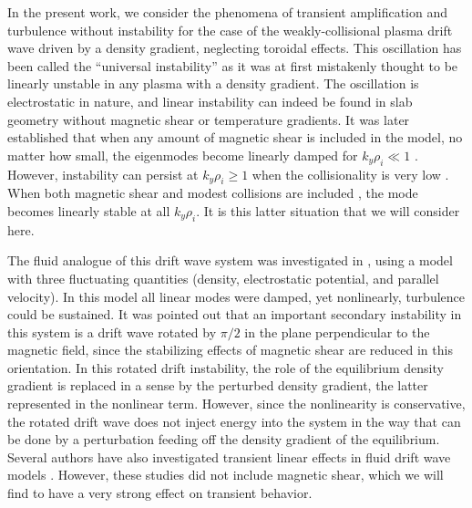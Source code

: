 \documentclass[12pt,superscriptaddress]{revtex4}
\begin{document}
In the present work, we consider the phenomena of transient amplification and turbulence
without instability for the case of the weakly-collisional
plasma drift wave driven by a density gradient\cite{Galeev,Krall3},
neglecting toroidal effects.
This oscillation has been called the ``universal instability'' as it was at first
mistakenly thought to be linearly unstable in any plasma with a density gradient.
The oscillation is electrostatic in nature, and linear instability can indeed be found
in slab geometry without magnetic shear or temperature gradients.
It was later established that when any amount of magnetic shear is included in the model,
no matter how small,
the eigenmodes become linearly damped for $k_y \rho_i \ll 1$
\cite{Ross, Tsang, Antonsen}.
However, instability can persist at $k_y \rho_i \ge 1$ when the collisionality is
very low \cite{usUniversalInstability}.
When both magnetic shear and modest collisions are included \cite{usUniversalInstability},
the mode becomes linearly stable at all $k_y \rho_i$.
It is this latter situation that we will consider here.

The fluid analogue of this drift wave system was investigated in \cite{Drake},
using a model with three fluctuating quantities (density, electrostatic potential, and parallel velocity).
In this model all linear modes were damped, yet nonlinearly, turbulence could be sustained.
It was pointed out that an important secondary
instability in this system is a drift wave rotated by $\pi/2$ in the plane
perpendicular to the magnetic field, since the stabilizing effects of magnetic
shear are reduced in this orientation.
In this rotated drift instability, the role of the equilibrium density gradient is replaced in a sense by the
perturbed density gradient, the latter represented in the nonlinear term.
However, since the nonlinearity is conservative, the rotated drift wave does not inject energy
into the system in the way that can be done by a perturbation feeding off the density gradient of the equilibrium.
Several authors have also investigated transient linear effects in fluid drift wave models
\cite{Camargo, Friedman1, Friedman2}. However, these studies did not
include magnetic shear, which we will find to have a very strong effect on
transient behavior.
\end{document}
